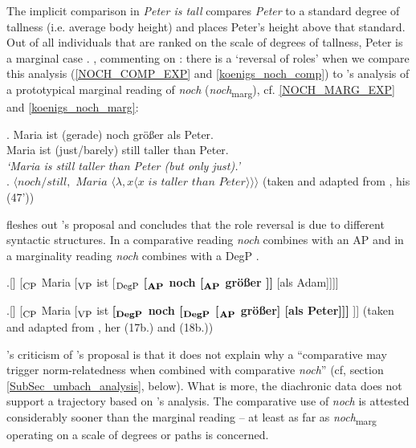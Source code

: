 \documentclass[output=paper,
modfonts
]{langscibook}
\begin{document}
The implicit comparison in \textit{Peter is tall} compares \textit{Peter} to a standard degree of tallness (i.e. average body height) and places Peter's height above that standard. Out of all individuals that are ranked on the scale of degrees of tallness, Peter is a marginal case \citep{koenig1977}. \citet{umbach2009a_comp}, commenting on \citet{koenig1977}: there is a `reversal of roles' when we compare this analysis (\ref{NOCH_COMP_EXP} and \ref{koenigs_noch_comp}) to \citeauthor{koenig1977}'s analysis of a prototypical marginal reading of \textit{noch} (\textit{noch}\textsubscript{marg}), cf. \ref{NOCH_MARG_EXP} and \ref{koenigs_noch_marg}:


\exg. Maria ist (gerade) noch größer als Peter.\\
Maria ist {(just/barely)} still taller than Peter.\\
\textit{`Maria is still taller than Peter (but only just).'} \label{NOCH_MARG_EXP} \\

\ex. $\langle noch/still,$ $Maria$ $\langle\lambda,x\langle x$ $is$ $taller$ $than$ $Peter\rangle\rangle\rangle$ \label{koenigs_noch_marg} \flushright (taken and adapted from \citeauthor{koenig1977} \citeyearpar{koenig1977}, his (47'))


\noindent\citet{umbach2009a_comp} fleshes out \citeauthor{koenig1977}'s \citeyearpar{koenig1977} proposal and concludes that the role reversal is due to different syntactic structures. In a comparative reading \textit{noch} combines with an AP  and in a marginality reading \textit{noch} combines with a DegP .


\ex.[] [$_{\textnormal{\footnotesize{CP}}}$ Maria [$_{\textnormal{\footnotesize{VP}}}$ ist [$_{\textnormal{\footnotesize{DegP}}}$ \textbf{[$_{\textbf{\footnotesize{AP}}}$ noch [$_{\textbf{\footnotesize{AP}}}$ größer ]]} [als Adam]]]] 

\ex.[] [$_{\textnormal{\footnotesize{CP}}}$ Maria [$_{\textnormal{\footnotesize{VP}}}$ ist \textbf{[$_{\textbf{\footnotesize{DegP}}}$ noch [$_{\textbf{\footnotesize{DegP}}}$ [$_{\textbf{\footnotesize{AP}}}$ größer] [als Peter]]]} ]] \flushright (taken and adapted from \citeauthor{umbach2009a_comp} \citeyearpar{umbach2009a_comp}, her (17b.) and (18b.))


\noindent\citeauthor{umbach2009a_comp}'s \citeyearpar{umbach2009a_comp} criticism of \citeauthor{koenig1977}'s \citeyearpar{koenig1977} proposal is that it does not explain why a ``comparative may trigger norm-relatedness when combined with comparative \textit{noch}'' (cf, section \ref{SubSec_umbach_analysis}, below). What is more, the diachronic data does not support a trajectory based on \citeauthor{koenig1977}'s analysis. The comparative use of \textit{noch} is attested considerably sooner than the marginal reading -- at least as far as \textit{noch}\textsubscript{marg} operating on a scale of degrees or paths is concerned.
\end{document}
